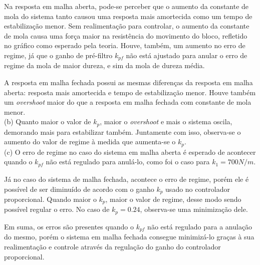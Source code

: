\documentclass[a4paper,11pt]{article}
\begin{document}
Na resposta em malha aberta, pode-se perceber que o aumento da constante de
mola do sistema tanto causou uma resposta mais amortecida como um tempo de
estabilização menor.
Sem realimentação para controlar, o aumento da constante de mola causa uma força
maior na resistência do movimento do bloco, refletido no gráfico como esperado
pela teoria.
Houve, também, um aumento no erro de regime, já que o ganho de pré-filtro
$k_{pf}$ não está ajustado para anular o erro de regime da mola de maior dureza,
e sim da mola de dureza média.

A resposta em malha fechada possui as mesmas diferenças da resposta em malha
aberta: resposta mais amortecida e tempo de estabilização menor. Houve também um
\textit{overshoot} maior do que a resposta em malha fechada com constante de
mola menor. \\

(b) Quanto maior o valor de $k_p$, maior o \textit{overshoot} e mais o sistema
oscila, demorando mais para estabilizar também. Juntamente com isso, observa-se
o aumento do valor de regime à medida que aumenta-se o $k_p$. \\

(c) O erro de regime no caso do sistema em malha aberta é esperado de acontecer
quando o $k_{pf}$ não está regulado para anulá-lo, como foi o caso para
$k_1 = 700 N/m$.

Já no caso do sistema de malha fechada, acontece o erro de regime, porém ele é
possível de ser diminuído de acordo com o ganho $k_p$ usado no controlador
proporcional. Quando maior o $k_p$, maior o valor de regime, desse modo sendo
possível regular o erro. No caso de $k_p = 0.24$, observa-se uma minimização
dele.

Em suma, os erros são presentes quando o $k_{pf}$ não está regulado para a
anulação do mesmo, porém o sistema em malha fechada consegue minimizá-lo graças
à sua realimentação e controle através da regulação do ganho do controlador
proporcional.
\end{document}
